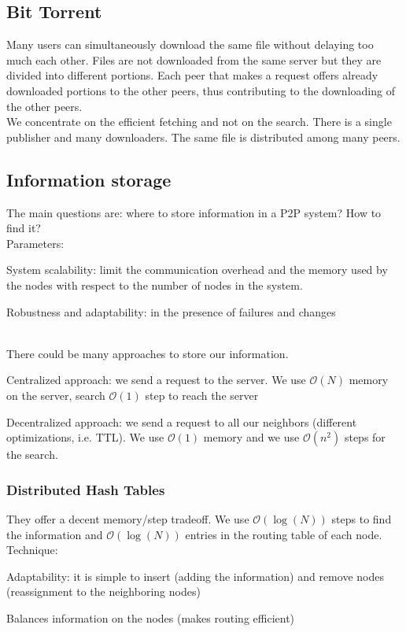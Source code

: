 \documentclass[paper=a4, fontsize=11pt]{scrartcl} %
\numberwithin{equation}{section} %
\numberwithin{figure}{section} %
\numberwithin{table}{section} %
\begin{document}
\subsection*{Bit Torrent}
Many users can simultaneously download the same file without delaying too much each other. Files are not downloaded from the same server but they are divided into different portions. Each peer that makes a request offers already downloaded portions to the other peers, thus contributing to the downloading of the other peers.\\
We concentrate on the efficient fetching and not on the search. There is a single publisher and many downloaders. The same file is distributed among many peers. 
\subsection*{Information storage}
The main questions are: where to store information in a P2P system? How to find it?\\
Parameters: 
\begin{compactitem}
\item System scalability: limit the communication overhead and the memory used by the nodes with respect to the number of nodes in the system.
\item Robustness and adaptability: in the presence of failures and changes
\end{compactitem}
~ \\
There could be many approaches to store our information.
\begin{compactitem}
\item Centralized approach: we send a request to the server. We use $\mathcal{O}(N)$ memory on the server, search $\mathcal{O}(1)$ step to reach the server
\item Decentralized approach: we send a request to all our neighbors (different optimizations, i.e. TTL). We use $\mathcal{O}(1)$ memory and we use $\mathcal{O}(n^2)$ steps for the search.
\end{compactitem}

\subsubsection*{Distributed Hash Tables}
They offer a decent memory/step tradeoff. We use $\mathcal{O}(\log(N))$ steps to find the information and $\mathcal{O}(\log(N))$ entries in the routing table of each node.\\
Technique: 
\begin{compactitem}
\item Adaptability: it is simple to insert (adding the information) and remove nodes (reassignment to the neighboring nodes)
\item Balances information on the nodes (makes routing efficient)
\end{compactitem}
\end{document}
